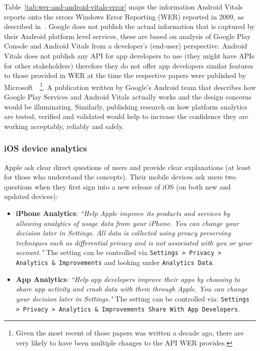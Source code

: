 Table~\ref{tab:wer-and-android-vitals-error} maps the information Android Vitals reports onto the errors Windows Error Reporting (WER) reported in 2009, as described in~\citep{kinshuman2009_debugging_in_the_very_large}. Google does not publish the actual information that is captured by their Android platform level services, these are based on analysis of Google Play Console and Android Vitals from a developer's (end-user) perspective. Android Vitals does not publish any API for app developers to use (they might have APIs for other stakeholders) therefore they do not offer app developers similar features to those provided in WER at the time the respective papers were published by Microsoft~\citep{kinshuman2009_debugging_in_the_very_large, kinshuman2011_debugging_in_the_very_large}~\footnote{Given the most recent of those papers was written a decade ago, there are very likely to have been multiple changes to the API WER provides.}. A publication written by Google's Android team that describes how Google Play Services and Android Vitals actually works and the design concerns would be illuminating. Similarly, publishing research on how platform analytics are tested, verified and validated would help to increase the confidence they are working acceptably, reliably and safely.

\subsubsection{iOS device analytics}
Apple ask clear direct questions of users and provide clear explanations (at least for those who understand the concepts). Their mobile devices ask users two questions when they first sign into a new release of iOS (on both new and updated devices):
\begin{itemize}
    \item \textbf{iPhone Analytics}: \emph{``Help Apple improve its products and services by allowing analytics of usage data from your iPhone. You can change your decision later in Settings. All data is collected using prvacy preserving techniques such as differential privacy and is not associated with you or your account."} The setting can be controlled via \texttt{Settings > Privacy > Analytics \& Improvements} and looking under \texttt{Analytics Data}.
    \item \textbf{App Analytics}: \emph{``Help app developers improve their apps by choosing to share app activity and crash data with them through Apple. You can change your decision later in Settings."} The setting can be controlled via: \texttt{Settings > Privacy > Analytics \& Improvements Share With App Developers}.
\end{itemize}

